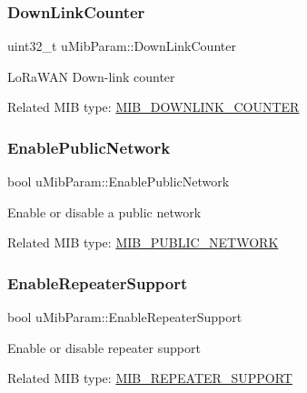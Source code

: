 \subsubsection{\texorpdfstring{Down\+Link\+Counter}{DownLinkCounter}}
{\footnotesize\ttfamily uint32\+\_\+t u\+Mib\+Param\+::\+Down\+Link\+Counter}

Lo\+Ra\+W\+AN Down-\/link counter

Related M\+IB type\+: \hyperlink{group__LORAMAC_gga32ea83d13a3f5bb4b3ec2ace2319ab61ae75b53deee33594312d1d2987c24b698}{M\+I\+B\+\_\+\+D\+O\+W\+N\+L\+I\+N\+K\+\_\+\+C\+O\+U\+N\+T\+ER} \mbox{\label{unionuMibParam_af926413a7ecbe5fcf8b223fff46ad8e2}} 
\subsubsection{\texorpdfstring{Enable\+Public\+Network}{EnablePublicNetwork}}
{\footnotesize\ttfamily bool u\+Mib\+Param\+::\+Enable\+Public\+Network}

Enable or disable a public network

Related M\+IB type\+: \hyperlink{group__LORAMAC_gga32ea83d13a3f5bb4b3ec2ace2319ab61ab2819c46ba94b53c1fb2c3a0bfa75e48}{M\+I\+B\+\_\+\+P\+U\+B\+L\+I\+C\+\_\+\+N\+E\+T\+W\+O\+RK} \mbox{\label{unionuMibParam_a9bf9eee9867513c64e39300c2c13c981}} 
\subsubsection{\texorpdfstring{Enable\+Repeater\+Support}{EnableRepeaterSupport}}
{\footnotesize\ttfamily bool u\+Mib\+Param\+::\+Enable\+Repeater\+Support}

Enable or disable repeater support

Related M\+IB type\+: \hyperlink{group__LORAMAC_gga32ea83d13a3f5bb4b3ec2ace2319ab61a2d0a50cc4dd24771854bd138934ef3e5}{M\+I\+B\+\_\+\+R\+E\+P\+E\+A\+T\+E\+R\+\_\+\+S\+U\+P\+P\+O\+RT} \mbox{\label{unionuMibParam_a2f94965111a263fa6808260203c020f8}} 
